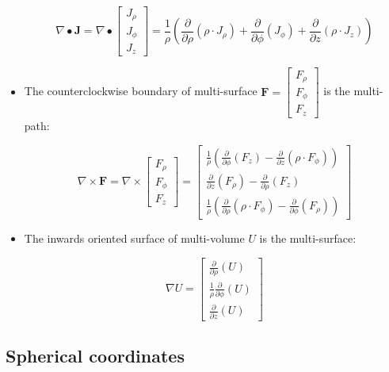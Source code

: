 \begin{itemize}
\[\nabla \bullet \mathbf{J} = \nabla \bullet \begin{bmatrix} J_\rho \\ J_\phi \\ J_z \end{bmatrix} = \frac{1}{\rho}\left(\frac{\partial}{\partial \rho}(\rho \cdot J_\rho) + \frac{\partial}{\partial \phi}(J_\phi) + \frac{\partial}{\partial z}(\rho \cdot J_z)\right)\]
\item The counterclockwise boundary of multi-surface \(\mathbf{F} = \begin{bmatrix} F_\rho \\ F_\phi \\ F_z \end{bmatrix}\) is the multi-path:

\[\nabla \times \mathbf{F} = \nabla \times \begin{bmatrix} F_\rho \\ F_\phi \\ F_z \end{bmatrix} = \begin{bmatrix} \frac{1}{\rho}\left(\frac{\partial}{\partial \phi}(F_z) - \frac{\partial}{\partial z}(\rho \cdot F_\phi) \right) \\ \frac{\partial}{\partial z}(F_\rho) - \frac{\partial}{\partial \rho}(F_z) \\ \frac{1}{\rho}\left(\frac{\partial}{\partial \rho}(\rho \cdot F_\phi) - \frac{\partial}{\partial \phi}(F_\rho)\right) \end{bmatrix}\]
\item The inwards oriented surface of multi-volume \(U\) is the multi-surface:

\[\nabla U = \begin{bmatrix} \frac{\partial}{\partial \rho}(U) \\ \frac{1}{\rho}\frac{\partial}{\partial \phi}(U) \\ \frac{\partial}{\partial z}(U) \end{bmatrix}\]
\end{itemize}




\subsection{Spherical coordinates}

